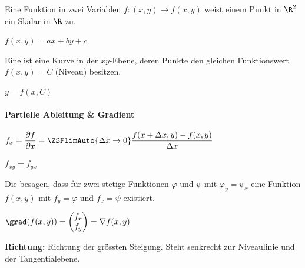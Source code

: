 

Eine Funktion in zwei Variablen $f : (x,y) \to f(x,y)$ weist einem Punkt in $\R^2$ ein Skalar in $\R$ zu.
\begin{formulabox}
    $\displaystyle f(x,y) = ax + by + c$
\end{formulabox}

Eine  ist eine Kurve in der $xy$-Ebene, deren Punkte den gleichen Funktionswert $f(x,y)=C$ (Niveau) besitzen.
\begin{formulabox}
    $\displaystyle y = f(x,C)$
\end{formulabox}

\paragraph*{Partielle Ableitung \& Gradient}
\begin{formulabox}
    $\displaystyle f_x = \frac{\partial f}{\partial x} = \ZSFlimAuto{\Delta x \to 0}\frac{f(x+\Delta x, y)-f(x,y)}{\Delta x}$
\end{formulabox}

\begin{formulabox}
    $\displaystyle f_{xy} = f_{yx}$
\end{formulabox}

Die  besagen, dass für zwei stetige Funktionen $\varphi$ und $\psi$ mit $\varphi_y=\psi_x$ eine Funktion $f(x,y)$ mit $f_y=\varphi$ und $f_x=\psi$ existiert.

\begin{formulabox}
    $\displaystyle \grad(f(x,y)) = \begin{pmatrix} f_x \\ f_y \end{pmatrix} = \nabla f(x,y)$
\end{formulabox}
\textbf{Richtung:} Richtung der grössten Steigung. Steht senkrecht zur Niveaulinie und der Tangentialebene.

